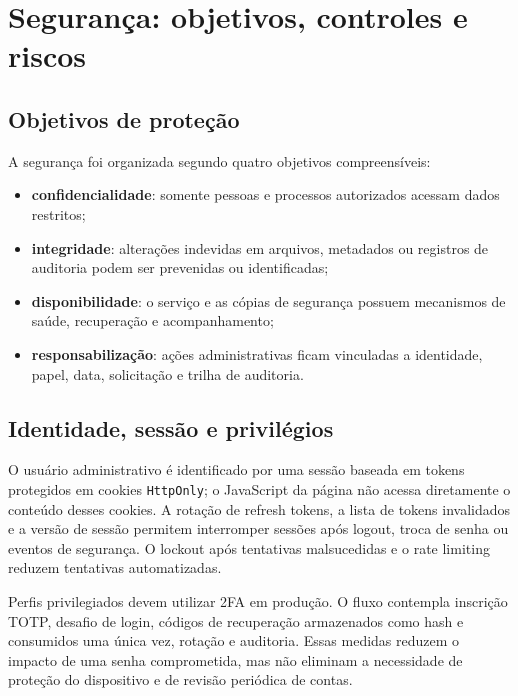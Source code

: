 \documentclass[11pt,a4paper]{article}
\newcommand{\code}[1]{\texttt{#1}}
\begin{document}
\section{Segurança: objetivos, controles e riscos}

\subsection{Objetivos de proteção}

A segurança foi organizada segundo quatro objetivos compreensíveis:

\begin{itemize}
  \item \textbf{confidencialidade}: somente pessoas e processos autorizados acessam dados restritos;
  \item \textbf{integridade}: alterações indevidas em arquivos, metadados ou registros de auditoria podem ser prevenidas ou identificadas;
  \item \textbf{disponibilidade}: o serviço e as cópias de segurança possuem mecanismos de saúde, recuperação e acompanhamento;
  \item \textbf{responsabilização}: ações administrativas ficam vinculadas a identidade, papel, data, solicitação e trilha de auditoria.
\end{itemize}

\subsection{Identidade, sessão e privilégios}

O usuário administrativo é identificado por uma sessão baseada em tokens protegidos em cookies \code{HttpOnly}; o JavaScript da página não acessa diretamente o conteúdo desses cookies. A rotação de refresh tokens, a lista de tokens invalidados e a versão de sessão permitem interromper sessões após logout, troca de senha ou eventos de segurança. O lockout após tentativas malsucedidas e o rate limiting reduzem tentativas automatizadas.

Perfis privilegiados devem utilizar 2FA em produção. O fluxo contempla inscrição TOTP, desafio de login, códigos de recuperação armazenados como hash e consumidos uma única vez, rotação e auditoria. Essas medidas reduzem o impacto de uma senha comprometida, mas não eliminam a necessidade de proteção do dispositivo e de revisão periódica de contas.
\end{document}
